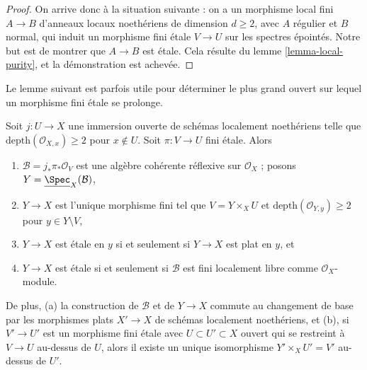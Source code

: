 \begin{proof}
\medskip\noindent
On arrive donc à la situation suivante : on a un morphisme
local fini $A \to B$ d'anneaux locaux noethériens
de dimension $d \geq 2$, avec $A$ régulier et $B$ normal, qui
induit un morphisme fini étale $V \to U$ sur les spectres épointés.
Notre but est de montrer que $A \to B$ est étale.
Cela résulte du lemme \ref{lemma-local-purity},
et la démonstration est achevée.
\end{proof}

\noindent
Le lemme suivant est parfois utile pour déterminer le plus grand
ouvert sur lequel un morphisme fini étale se prolonge.

\begin{lemma}
\label{lemma-extend-S2}
Soit $j : U \to X$ une immersion ouverte de schémas localement noethériens
telle que $\text{depth}(\mathcal{O}_{X, x}) \geq 2$ pour $x \not \in U$.
Soit $\pi : V \to U$ fini étale. Alors
\begin{enumerate}
\item $\mathcal{B} = j_*\pi_*\mathcal{O}_V$ est une algèbre cohérente
réflexive sur $\mathcal{O}_X$ ; posons $Y = \underline{\Spec}_X(\mathcal{B})$,
\item $Y \to X$ est l'unique morphisme fini tel que
$V = Y \times_X U$ et $\text{depth}(\mathcal{O}_{Y, y}) \geq 2$
pour $y \in Y \setminus V$,
\item $Y \to X$ est étale en $y$ si et seulement si $Y \to X$ est plat en $y$, et
\item $Y \to X$ est étale si et seulement si $\mathcal{B}$
est fini localement libre comme $\mathcal{O}_X$-module.
\end{enumerate}
De plus, (a) la construction de $\mathcal{B}$ et de $Y \to X$ commute
au changement de base par les morphismes plats $X' \to X$ de schémas
localement noethériens, et (b), si $V' \to U'$ est un morphisme fini étale avec
$U \subset U' \subset X$ ouvert qui se restreint à $V \to U$ au-dessus de $U$,
alors il existe un unique isomorphisme $Y' \times_X U' = V'$ au-dessus de $U'$.
\end{lemma}

